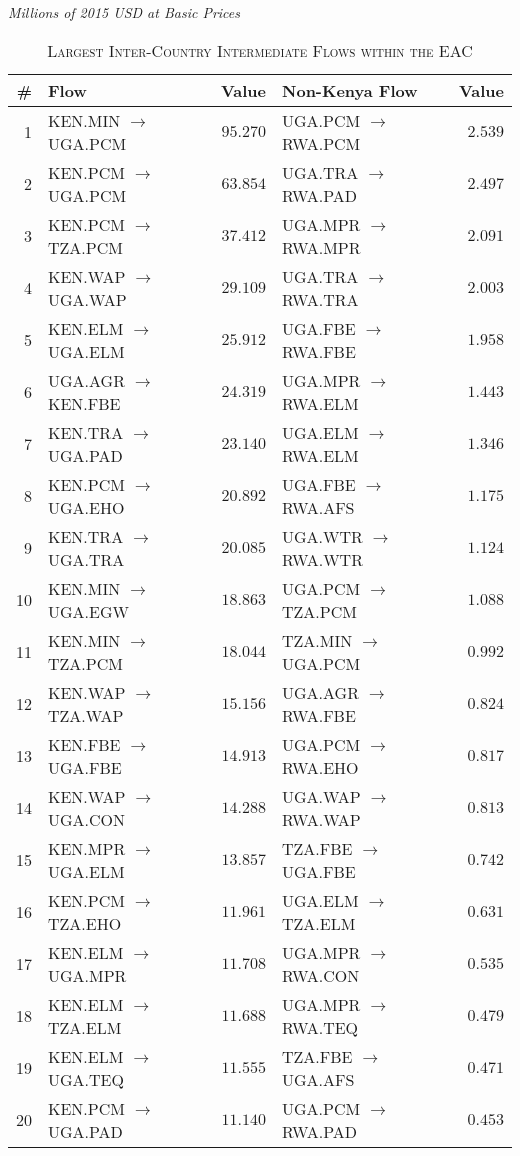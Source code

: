 \documentclass[a4paper]{article}
\begin{document}
\begin{table}[!htbp] \centering 
  \caption{\textsc{Largest Inter-Country Intermediate Flows within the EAC}} 
  \small{\textit{Millions of 2015 USD at Basic Prices}}
  \label{tab:eaclfl} 
  \vspace{2mm}
\begin{tabular}{rlrlr} \toprule
\textbf{\#} & \textbf{Flow} & \textbf{Value} & \textbf{Non-Kenya Flow} & \textbf{Value} \\ 
\midrule
1 & KEN.MIN $\to$ UGA.PCM & $95.270$ & UGA.PCM $\to$ RWA.PCM & $2.539$ \\ 
2 & KEN.PCM $\to$ UGA.PCM & $63.854$ & UGA.TRA $\to$ RWA.PAD & $2.497$ \\ 
3 & KEN.PCM $\to$ TZA.PCM & $37.412$ & UGA.MPR $\to$ RWA.MPR & $2.091$ \\ 
4 & KEN.WAP $\to$ UGA.WAP & $29.109$ & UGA.TRA $\to$ RWA.TRA & $2.003$ \\ 
5 & KEN.ELM $\to$ UGA.ELM & $25.912$ & UGA.FBE $\to$ RWA.FBE & $1.958$ \\ 
6 & UGA.AGR $\to$ KEN.FBE & $24.319$ & UGA.MPR $\to$ RWA.ELM & $1.443$ \\ 
7 & KEN.TRA $\to$ UGA.PAD & $23.140$ & UGA.ELM $\to$ RWA.ELM & $1.346$ \\ 
8 & KEN.PCM $\to$ UGA.EHO & $20.892$ & UGA.FBE $\to$ RWA.AFS & $1.175$ \\ 
9 & KEN.TRA $\to$ UGA.TRA & $20.085$ & UGA.WTR $\to$ RWA.WTR & $1.124$ \\ 
10 & KEN.MIN $\to$ UGA.EGW & $18.863$ & UGA.PCM $\to$ TZA.PCM & $1.088$ \\ 
11 & KEN.MIN $\to$ TZA.PCM & $18.044$ & TZA.MIN $\to$ UGA.PCM & $0.992$ \\ 
12 & KEN.WAP $\to$ TZA.WAP & $15.156$ & UGA.AGR $\to$ RWA.FBE & $0.824$ \\ 
13 & KEN.FBE $\to$ UGA.FBE & $14.913$ & UGA.PCM $\to$ RWA.EHO & $0.817$ \\ 
14 & KEN.WAP $\to$ UGA.CON & $14.288$ & UGA.WAP $\to$ RWA.WAP & $0.813$ \\ 
15 & KEN.MPR $\to$ UGA.ELM & $13.857$ & TZA.FBE $\to$ UGA.FBE & $0.742$ \\ 
16 & KEN.PCM $\to$ TZA.EHO & $11.961$ & UGA.ELM $\to$ TZA.ELM & $0.631$ \\ 
17 & KEN.ELM $\to$ UGA.MPR & $11.708$ & UGA.MPR $\to$ RWA.CON & $0.535$ \\ 
18 & KEN.ELM $\to$ TZA.ELM & $11.688$ & UGA.MPR $\to$ RWA.TEQ & $0.479$ \\ 
19 & KEN.ELM $\to$ UGA.TEQ & $11.555$ & TZA.FBE $\to$ UGA.AFS & $0.471$ \\ 
20 & KEN.PCM $\to$ UGA.PAD & $11.140$ & UGA.PCM $\to$ RWA.PAD & $0.453$ \\ 
\bottomrule
\end{tabular} 
\end{table} 
\FloatBarrier
\end{document}
